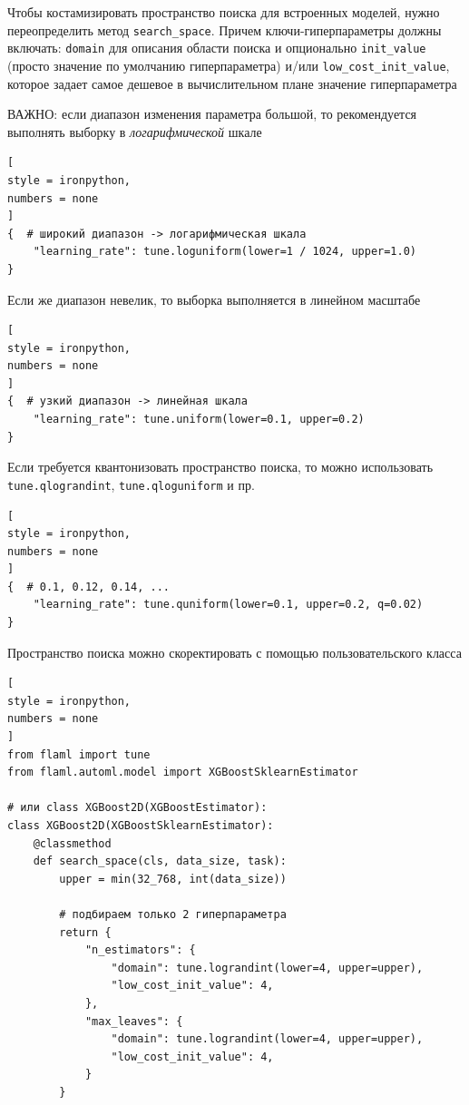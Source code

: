 \documentclass[%
	11pt,
	a4paper,
	utf8,
		]{article}
\begin{document}
Чтобы костамизировать пространство поиска для встроенных моделей, нужно переопределить метод \verb|search_space|. Причем ключи-гиперпараметры должны включать: \verb|domain| для описания области поиска и опционально \verb|init_value| (просто значение по умолчанию гиперпараметра) и/или \verb|low_cost_init_value|, которое задает самое дешевое в вычислительном плане значение гиперпараметра

ВАЖНО: если диапазон изменения параметра большой, то рекомендуется выполнять выборку в \emph{логарифмической} шкале
\begin{lstlisting}[
style = ironpython,
numbers = none
]
{  # широкий диапазон -> логарифмическая шкала
    "learning_rate": tune.loguniform(lower=1 / 1024, upper=1.0)
}
\end{lstlisting}

Если же диапазон невелик, то выборка выполняется в линейном масштабе
\begin{lstlisting}[
style = ironpython,
numbers = none
]
{  # узкий диапазон -> линейная шкала
    "learning_rate": tune.uniform(lower=0.1, upper=0.2)
}
\end{lstlisting}

Если требуется квантонизовать пространство поиска, то можно использовать \verb|tune.qlograndint|,  \verb|tune.qloguniform| и пр.
\begin{lstlisting}[
style = ironpython,
numbers = none
]
{  # 0.1, 0.12, 0.14, ...
    "learning_rate": tune.quniform(lower=0.1, upper=0.2, q=0.02)
}
\end{lstlisting}

Пространство поиска можно скоректировать с помощью пользовательского класса

\begin{lstlisting}[
style = ironpython,
numbers = none
]
from flaml import tune 
from flaml.automl.model import XGBoostSklearnEstimator

# или class XGBoost2D(XGBoostEstimator):
class XGBoost2D(XGBoostSklearnEstimator):
    @classmethod
    def search_space(cls, data_size, task):
        upper = min(32_768, int(data_size))
        
        # подбираем только 2 гиперпараметра
        return {
            "n_estimators": {
                "domain": tune.lograndint(lower=4, upper=upper),
                "low_cost_init_value": 4,
            },
            "max_leaves": {
                "domain": tune.lograndint(lower=4, upper=upper),
                "low_cost_init_value": 4,
            }
        }
\end{lstlisting}
\end{document}
